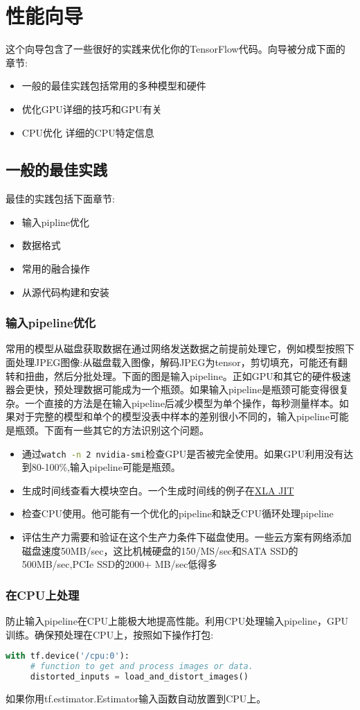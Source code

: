 \section{性能向导}
这个向导包含了一些很好的实践来优化你的TensorFlow代码。向导被分成下面的章节:
\begin{itemize}
\item 一般的最佳实践包括常用的多种模型和硬件
\item 优化GPU详细的技巧和GPU有关
\item CPU优化 详细的CPU特定信息
\end{itemize}
\subsection{一般的最佳实践}
最佳的实践包括下面章节:
\begin{itemize}
	\item 输入pipline优化
	\item 数据格式
	\item 常用的融合操作
	\item 从源代码构建和安装
\end{itemize}
\subsubsection{输入pipeline优化}
常用的模型从磁盘获取数据在通过网络发送数据之前提前处理它，例如模型按照下面处理JPEG图像:从磁盘载入图像，解码JPEG为tensor，剪切填充，可能还有翻转和扭曲，然后分批处理。下面的图是输入pipeline。正如GPU和其它的硬件极速器会更快，预处理数据可能成为一个瓶颈。如果输入pipeline是瓶颈可能变得很复杂。一个直接的方法是在输入pipeline后减少模型为单个操作，每秒测量样本。如果对于完整的模型和单个的模型没表中样本的差别很小不同的，输入pipeline可能是瓶颈。下面有一些其它的方法识别这个问题。
\begin{itemize}
	\item 通过\lstinline[language=Bash]{watch -n 2 nvidia-smi}检查GPU是否被完全使用。如果GPU利用没有达到80-100\%,输入pipeline可能是瓶颈。
	\item 生成时间线查看大模块空白。一个生成时间线的例子在\href{https://www.tensorflow.org/performance/xla/jit}{XLA JIT}
	\item 检查CPU使用。他可能有一个优化的pipeline和缺乏CPU循环处理pipeline
	\item 评估生产力需要和验证在这个生产力条件下磁盘使用。一些云方案有网络添加磁盘速度50MB/sec，这比机械硬盘的150/MS/sec和SATA SSD的500MB/sec,PCIe SSD的2000+
 MB/sec低得多\end{itemize}
 \subsubsection{在CPU上处理}
 防止输入pipeline在CPU上能极大地提高性能。利用CPU处理输入pipeline，GPU训练。确保预处理在CPU上，按照如下操作打包:
 \begin{lstlisting}[language=Python]
 with tf.device('/cpu:0'):
     # function to get and process images or data.
     distorted_inputs = load_and_distort_images()
 \end{lstlisting}
 如果你用tf.estimator.Estimator输入函数自动放置到CPU上。
